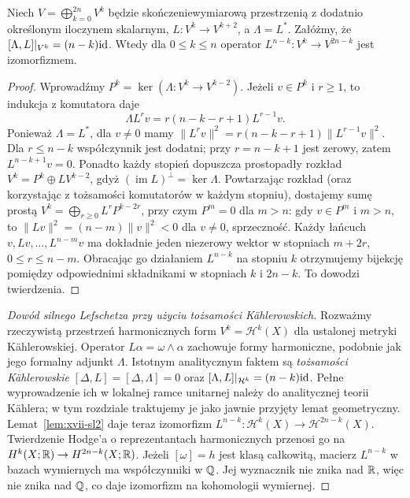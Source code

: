 \begin{lemat}
\label{lem:xvii-sl2}
Niech $V=\bigoplus_{k=0}^{2n}V^k$ będzie skończeniewymiarową
przestrzenią z dodatnio określonym iloczynem skalarnym,
$L:V^k\to V^{k+2}$, a $\Lambda=L^*$.
Załóżmy, że $[\Lambda,L]|_{V^k}=(n-k)\mathrm{id}$.
Wtedy dla $0\le k\le n$ operator
$L^{n-k}:V^k\to V^{2n-k}$ jest izomorfizmem.
\end{lemat}
\begin{proof}
Wprowadźmy $P^k=\ker(\Lambda:V^k\to V^{k-2})$.
Jeżeli $v\in P^k$ i $r\ge1$, to indukcja z komutatora daje
\[
\Lambda L^rv=r(n-k-r+1)L^{r-1}v.
\]
Ponieważ $\Lambda=L^*$, dla $v\ne0$ mamy
$\|L^rv\|^2=r(n-k-r+1)\|L^{r-1}v\|^2$.
Dla $r\le n-k$ współczynnik jest dodatni; przy
$r=n-k+1$ jest zerowy, zatem $L^{n-k+1}v=0$.
Ponadto każdy stopień dopuszcza prostopadły rozkład
$V^k=P^k\oplus LV^{k-2}$, gdyż $(\operatorname{im}L)^\perp=\ker\Lambda$.
Powtarzając rozkład (oraz korzystając z tożsamości komutatorów
w każdym stopniu), dostajemy sumę prostą
$V^k=\bigoplus_{r\ge0}L^rP^{k-2r}$, przy czym
$P^m=0$ dla $m>n$: gdy $v\in P^m$ i $m>n$, to
$\|Lv\|^2=(n-m)\|v\|^2<0$ dla $v\ne0$, sprzeczność.
Każdy łańcuch $v,Lv,\ldots,L^{n-m}v$ ma dokładnie
jeden niezerowy wektor w stopniach $m+2r$,
$0\le r\le n-m$. Obracając go działaniem $L^{n-k}$
na stopniu $k$ otrzymujemy bijekcję pomiędzy
odpowiednimi składnikami w stopniach $k$ i $2n-k$.
To dowodzi twierdzenia.
\end{proof}
\begin{proof}[Dowód silnego Lefschetza przy użyciu tożsamości Kählerowskich]
Rozważmy rzeczywistą przestrzeń harmonicznych form
$V^k=\mathcal H^k(X)$ dla ustalonej metryki Kählerowskiej.
Operator $L\alpha=\omega\wedge\alpha$ zachowuje formy
harmoniczne, podobnie jak jego formalny adjunkt $\Lambda$.
Istotnym analitycznym faktem są \emph{tożsamości Kählerowskie}
$[\Delta,L]=[\Delta,\Lambda]=0$ oraz
$[\Lambda,L]|_{\mathcal H^k}=(n-k)\mathrm{id}$.
Pełne wyprowadzenie ich w lokalnej ramce unitarnej należy do
analitycznej teorii Kählera; w tym rozdziale traktujemy je jako
jawnie przyjęty lemat geometryczny.
Lemat~\ref{lem:xvii-sl2} daje teraz izomorfizm
$L^{n-k}:\mathcal H^k(X)\to\mathcal H^{2n-k}(X)$.
Twierdzenie Hodge'a o reprezentantach harmonicznych
przenosi go na $H^k(X;\mathbb{R})\to H^{2n-k}(X;\mathbb{R})$.
Jeżeli $[\omega]=h$ jest klasą całkowitą,
macierz $L^{n-k}$ w bazach wymiernych ma współczynniki
w $\mathbb{Q}$. Jej wyznacznik nie znika nad $\mathbb{R}$, więc nie znika
nad $\mathbb{Q}$, co daje izomorfizm na kohomologii wymiernej.
\end{proof}

